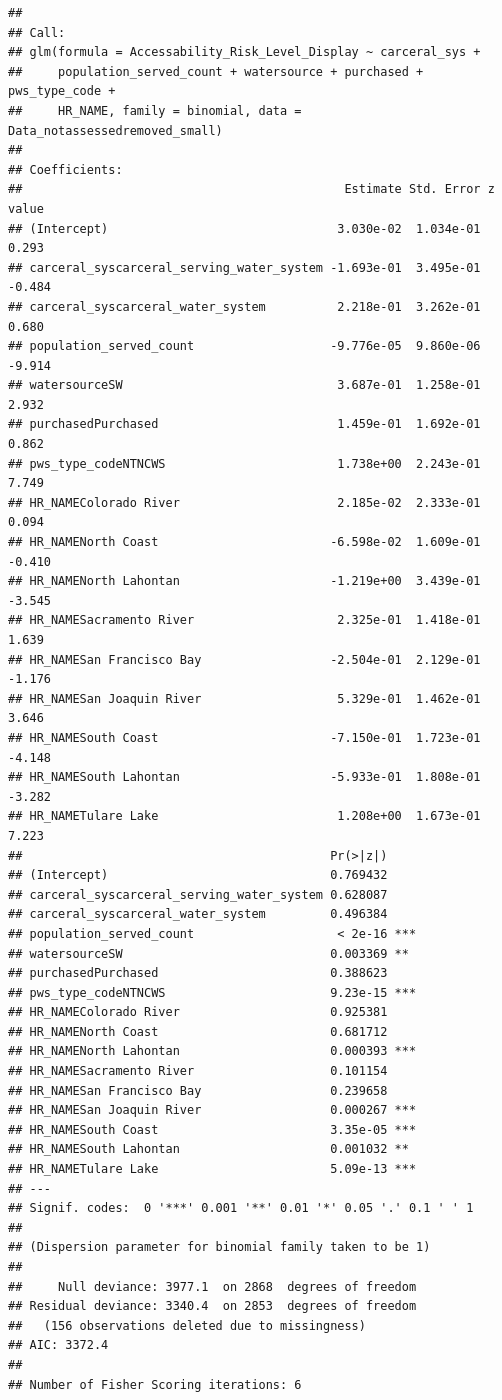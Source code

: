\documentclass[
]{article}
\begin{document}
\begin{verbatim}
## 
## Call:
## glm(formula = Accessability_Risk_Level_Display ~ carceral_sys + 
##     population_served_count + watersource + purchased + pws_type_code + 
##     HR_NAME, family = binomial, data = Data_notassessedremoved_small)
## 
## Coefficients:
##                                             Estimate Std. Error z value
## (Intercept)                                3.030e-02  1.034e-01   0.293
## carceral_syscarceral_serving_water_system -1.693e-01  3.495e-01  -0.484
## carceral_syscarceral_water_system          2.218e-01  3.262e-01   0.680
## population_served_count                   -9.776e-05  9.860e-06  -9.914
## watersourceSW                              3.687e-01  1.258e-01   2.932
## purchasedPurchased                         1.459e-01  1.692e-01   0.862
## pws_type_codeNTNCWS                        1.738e+00  2.243e-01   7.749
## HR_NAMEColorado River                      2.185e-02  2.333e-01   0.094
## HR_NAMENorth Coast                        -6.598e-02  1.609e-01  -0.410
## HR_NAMENorth Lahontan                     -1.219e+00  3.439e-01  -3.545
## HR_NAMESacramento River                    2.325e-01  1.418e-01   1.639
## HR_NAMESan Francisco Bay                  -2.504e-01  2.129e-01  -1.176
## HR_NAMESan Joaquin River                   5.329e-01  1.462e-01   3.646
## HR_NAMESouth Coast                        -7.150e-01  1.723e-01  -4.148
## HR_NAMESouth Lahontan                     -5.933e-01  1.808e-01  -3.282
## HR_NAMETulare Lake                         1.208e+00  1.673e-01   7.223
##                                           Pr(>|z|)    
## (Intercept)                               0.769432    
## carceral_syscarceral_serving_water_system 0.628087    
## carceral_syscarceral_water_system         0.496384    
## population_served_count                    < 2e-16 ***
## watersourceSW                             0.003369 ** 
## purchasedPurchased                        0.388623    
## pws_type_codeNTNCWS                       9.23e-15 ***
## HR_NAMEColorado River                     0.925381    
## HR_NAMENorth Coast                        0.681712    
## HR_NAMENorth Lahontan                     0.000393 ***
## HR_NAMESacramento River                   0.101154    
## HR_NAMESan Francisco Bay                  0.239658    
## HR_NAMESan Joaquin River                  0.000267 ***
## HR_NAMESouth Coast                        3.35e-05 ***
## HR_NAMESouth Lahontan                     0.001032 ** 
## HR_NAMETulare Lake                        5.09e-13 ***
## ---
## Signif. codes:  0 '***' 0.001 '**' 0.01 '*' 0.05 '.' 0.1 ' ' 1
## 
## (Dispersion parameter for binomial family taken to be 1)
## 
##     Null deviance: 3977.1  on 2868  degrees of freedom
## Residual deviance: 3340.4  on 2853  degrees of freedom
##   (156 observations deleted due to missingness)
## AIC: 3372.4
## 
## Number of Fisher Scoring iterations: 6
\end{verbatim}
\end{document}
